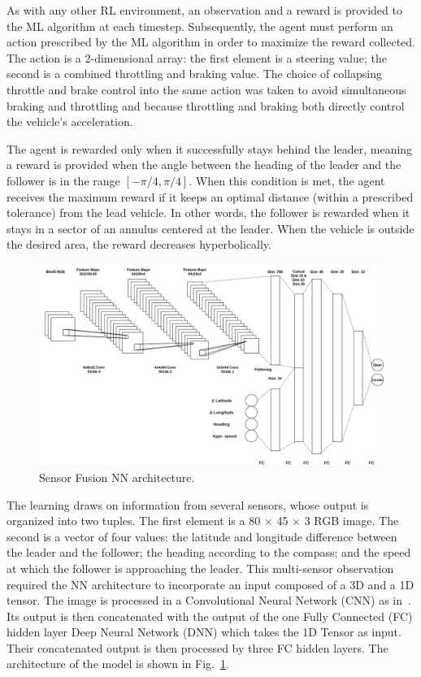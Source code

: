 \documentclass[12pt,twocolumn]{article}
\begin{document}
As with any other RL environment, an observation and a reward is provided to the ML algorithm at each timestep. Subsequently, the agent must perform an action prescribed by the ML algorithm in order to maximize the reward collected. The action is a 2-dimensional array: the first element is a steering value; the second is a combined throttling and braking value. The choice of collapsing throttle and brake control into the same action was taken to avoid simultaneous braking and throttling and because throttling and braking both directly control the vehicle's acceleration. 

The agent is rewarded only when it successfully stays behind the leader, meaning a reward is provided when the angle between the heading of the leader and the follower is in the range $[-\pi/4, \pi/4]$. When this condition is met, the agent receives the maximum reward if it keeps an optimal distance (within a prescribed tolerance) from the lead vehicle. In other words, the follower is rewarded when it stays in a sector of an annulus centered at the leader. When the vehicle is outside the desired area, the reward decreases hyperbolically. 
\begin{figure}
    \centering
    \includegraphics[angle=90,width=0.6\linewidth]{Figs/MS_NN.png}
    \caption{{\small Sensor Fusion NN architecture.}}   
    \label{fig:NNarch}
\end{figure}

The learning draws on information from several sensors, whose output is organized into two tuples. The first element is a 80 $\times$ 45 $\times$ 3 RGB image. The second is a vector of four values: the latitude and longitude difference between the leader and the follower; the heading according to the compass; and the speed at which the follower is approaching the leader. This multi-sensor observation required the NN architecture to incorporate an input composed of a 3D and a 1D tensor. The image is processed in a Convolutional Neural Network (CNN) as in~\cite{Mnih13}. Its output is then concatenated with the output of the one Fully Connected (FC) hidden layer Deep Neural Network (DNN) which takes the 1D Tensor as input. Their concatenated output is then processed by three FC hidden layers. The architecture of the model is shown in Fig.~\ref{fig:NNarch}.
\end{document}
